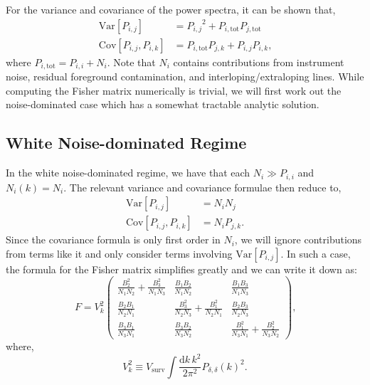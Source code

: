 \documentclass{aastex62}
\newcommand{\beq}{\begin{equation}}
\newcommand{\eeq}{\end{equation}}
\newcommand{\ps}[1]{\ensuremath{P_{#1,#1}}}
\newcommand{\xps}[2]{\ensuremath{P_{#1,#2}}}
\newcommand{\denps}{\ensuremath{P_{\delta,\delta}}}
\newcommand{\pstot}[1]{\ensuremath{P_{#1,\text{tot}}}}
\newcommand{\Var}[1]{\mathrm{Var}[#1]}
\newcommand{\Cov}[2]{\mathrm{Cov}[#1,#2]}
\begin{document}
For the variance and covariance of the power spectra, it can be shown that,
\beq\label{eq:var_cov}
\begin{split}
\Var{\xps{i}{j}} &= \xps{i}{j}^2 + \pstot{i}\pstot{j} \\
\Cov{\xps{i}{j}}{\xps{i}{k}} &= \pstot{i}\xps{j}{k} +
\xps{i}{j}\xps{i}{k}\text{,}
\end{split}
\eeq
where $\pstot{i} = \ps{i} + N_i$. Note that $N_i$ contains contributions
from instrument noise, residual foreground contamination, and
interloping/extraloping lines. While computing the Fisher matrix numerically
is trivial, we will first work out the noise-dominated case which has a
somewhat tractable analytic solution.

\subsection{White Noise-dominated Regime} \label{ssec:tf_noisedom}
In the white noise-dominated regime, we have that each $N_i \gg \ps{i}$ and
$N_i(k) = N_i$. The relevant variance and covariance formulae then reduce to,
\beq\label{eq:var_cov}
\begin{split}
\Var{\xps{i}{j}} &= N_iN_j \\
\Cov{\xps{i}{j}}{\xps{i}{k}} &= N_i\xps{j}{k}\text{.}
\end{split}
\eeq
Since the covariance formula is only first order in $N_i$, we will ignore
contributions from terms like it and only consider terms involving
$\Var{\xps{i}{j}}$. In such a case, the formula for the Fisher matrix
simplifies greatly and we can write it down as:
\beq \label{eq:fmat_tf_exp}
F = V_k^2
\begin{pmatrix}
\frac{B_2^2}{N_1N_2}+\frac{B_3^2}{N_1N_3} & \frac{B_1B_2}{N_1N_2} & \frac{B_1B_3}{N_1N_3} \\
\frac{B_2B_1}{N_2N_1} & \frac{B_3^2}{N_2N_3}+\frac{B_1^2}{N_2N_1} & \frac{B_2B_3}{N_2N_3} \\
\frac{B_3B_1}{N_3N_1} & \frac{B_3B_2}{N_3N_2} & \frac{B_1^2}{N_3N_1}+\frac{B_2^2}{N_3N_2}
\end{pmatrix}
\text{,}
\eeq
where,
\beq \label{eq:Vk}
V_k^2 \equiv V_{\text{surv}} \int \frac{\text{d}k\,k^2}{2\pi^2} \denps(k)^2\text{.}
\eeq
\end{document}
